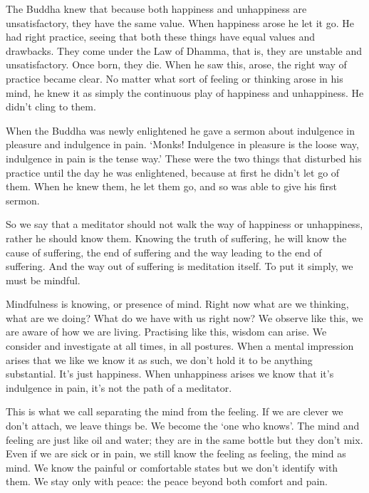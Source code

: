 The Buddha knew that because both happiness and unhappiness are unsatisfactory, they have the same value. When happiness arose he let it go. He had right practice, seeing that both these things have equal values and drawbacks. They come under the Law of Dhamma, that is, they are unstable and unsatisfactory. Once born, they die. When he saw this,  arose, the right way of practice became clear. No matter what sort of feeling or thinking arose in his mind, he knew it as simply the continuous play of happiness and unhappiness. He didn't cling to them. 

When the Buddha was newly enlightened he gave a sermon about indulgence in pleasure and indulgence in pain. `Monks! Indulgence in pleasure is the loose way, indulgence in pain is the tense way.' These were the two things that disturbed his practice until the day he was enlightened, because at first he didn't let go of them. When he knew them, he let them go, and so was able to give his first sermon. 

So we say that a meditator should not walk the way of happiness or unhappiness, rather he should know them. Knowing the truth of suffering, he will know the cause of suffering, the end of suffering and the way leading to the end of suffering. And the way out of suffering is meditation itself. To put it simply, we must be mindful. 

Mindfulness is knowing, or presence of mind. Right now what are we thinking, what are we doing? What do we have with us right now? We observe like this, we are aware of how we are living. Practising like this, wisdom can arise. We consider and investigate at all times, in all postures. When a mental impression arises that we like we know it as such, we don't hold it to be anything substantial. It's just happiness. When unhappiness arises we know that it's indulgence in pain, it's not the path of a meditator. 

This is what we call separating the mind from the feeling. If we are clever we don't attach, we leave things be. We become the `one who knows'. The mind and feeling are just like oil and water; they are in the same bottle but they don't mix. Even if we are sick or in pain, we still know the feeling as feeling, the mind as mind. We know the painful or comfortable states but we don't identify with them. We stay only with peace: the peace beyond both comfort and pain. 

